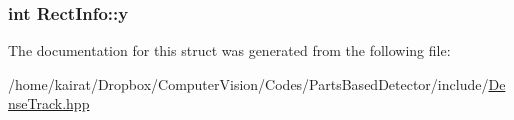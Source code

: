 \subsubsection[{y}]{\setlength{\rightskip}{0pt plus 5cm}int Rect\+Info\+::y}\label{structRectInfo_a33dcc1cf63d0c365fc4f5cd716591d59}


The documentation for this struct was generated from the following file\+:\begin{DoxyCompactItemize}
\item 
/home/kairat/\+Dropbox/\+Computer\+Vision/\+Codes/\+Parts\+Based\+Detector/include/\hyperlink{DenseTrack_8hpp}{Dense\+Track.\+hpp}\end{DoxyCompactItemize}
